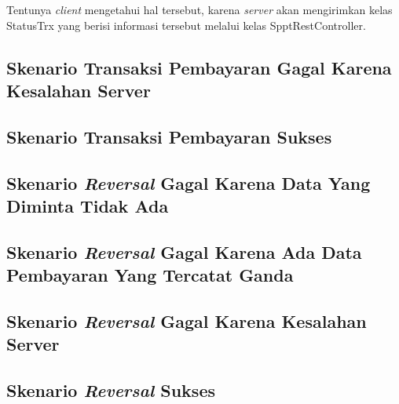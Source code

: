 Tentunya \textit{client} mengetahui hal tersebut, karena \textit{server} akan mengirimkan kelas StatusTrx yang berisi informasi tersebut melalui kelas SpptRestController.

\subsection{Skenario Transaksi Pembayaran Gagal Karena Kesalahan Server}
\subsection{Skenario Transaksi Pembayaran Sukses}
\subsection{Skenario \textit{Reversal} Gagal Karena Data Yang Diminta Tidak Ada}
\subsection{Skenario \textit{Reversal} Gagal Karena Ada Data Pembayaran Yang Tercatat Ganda}
\subsection{Skenario \textit{Reversal} Gagal Karena Kesalahan Server}
\subsection{Skenario \textit{Reversal} Sukses}

